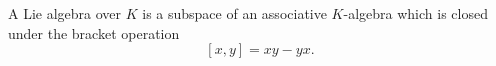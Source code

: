 A Lie algebra over $K$ is a subspace of an associative $K$-algebra which is closed under the bracket operation
$$[x, y] = xy - yx.$$
